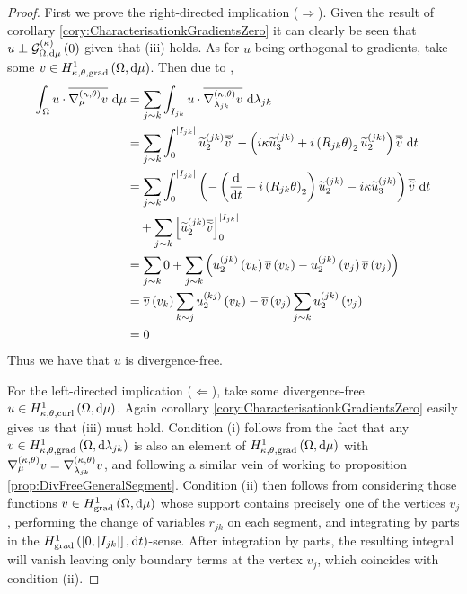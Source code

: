 \begin{proof}
	First we prove the right-directed implication ($\Rightarrow$).
	Given the result of corollary \ref{cory:CharacterisationkGradientsZero} it can clearly be seen that $u\perp\mathcal{G}_{ \Omega, \mathrm{d}\mu}^{(\kappa)}\left( 0 \right)$ given that (iii) holds.
	As for $u$ being orthogonal to gradients, take some $v\in H^1_{\kappa,\theta,\mathrm{grad}}\left( \Omega, \mathrm{d}\mu \right)$.
	Then due to ,
	\begin{align*}
		\integral{\ddom}{u\cdot\overline{\ktgrad_\ddmes v}}{\ddmes}
		&= \sum_{j\sim k}\integral{I_{jk}}{u\cdot\overline{\ktgrad_{\lambda_{jk}} v}}{\lambda_{jk}} \\
		&= \sum_{j\sim k}\int_0^{\abs{I_{jk}}} \widetilde{u}_2^{(jk)}\overline{\widetilde{v}}' - \bracs{i\wavenumber\widetilde{u}_3^{(jk)} + i\bracs{R_{jk}\qm}_2\widetilde{u}_2^{(jk)}}\overline{\widetilde{v}} \ \md t \\
		&= \sum_{j\sim k}\int_0^{\abs{I_{jk}}} \bracs{-\bracs{\diff{}{t} + i\bracs{R_{jk}\qm}_2}\widetilde{u}^{(jk)}_2 - i\wavenumber\widetilde{u}^{(jk)}_3}\overline{\widetilde{v}} \ \md t \\
		& \quad + \sum_{j\sim k}\sqbracs{\widetilde{u}_2^{(jk)}\overline{\widetilde{v}}}_0^{\abs{I_{jk}}} \\
		&= \sum_{j\sim k} 0 + \sum_{j\sim k} \bracs{ u_2^{(jk)}\bracs{v_k}\overline{v}\bracs{v_k} - u_2^{(jk)}\bracs{v_j}\overline{v}\bracs{v_j} } \\
		&= \overline{v}\bracs{v_k}\sum_{k\sim j} u_2^{(kj)}\bracs{v_k}
		- \overline{v}\bracs{v_j}\sum_{j\sim k} u_2^{(jk)}\bracs{v_j} \\
		&= 0
	\end{align*}
	Thus we have that $u$ is divergence-free. \newline
	
	For the left-directed implication ($\Leftarrow$), take some divergence-free $u\in H^1_{\kappa,\theta,\mathrm{curl}}\left( \Omega, \mathrm{d}\mu \right)$.
	Again corollary \ref{cory:CharacterisationkGradientsZero} easily gives us that (iii) must hold.
	Condition (i) follows from the fact that any $v\in H^1_{\kappa,\theta,\mathrm{grad}}\left( \Omega, \mathrm{d}\lambda_{jk} \right)$ is also an element of $H^1_{\kappa,\theta,\mathrm{grad}}\left( \Omega, \mathrm{d}\mu \right)$ with $\nabla^{\left( \kappa, \theta \right)}_\mu v = \nabla^{\left( \kappa, \theta \right)}_{\lambda_{jk}}v$, and following a similar vein of working to proposition \ref{prop:DivFreeGeneralSegment}.
	Condition (ii) then follows from considering those functions $v\in H^1_\mathrm{grad}\left( \Omega, \mathrm{d}\mu \right)$ whose support contains precisely one of the vertices $v_j$, performing the change of variables $r_{jk}$ on each segment, and integrating by parts in the $H^1_\mathrm{grad}\left( \left[ 0,\left\lvert I_{jk} \right\rvert \right], \mathrm{d}t \right)$-sense.
	After integration by parts, the resulting integral will vanish leaving only boundary terms at the vertex $v_j$, which coincides with condition (ii).
\end{proof}

